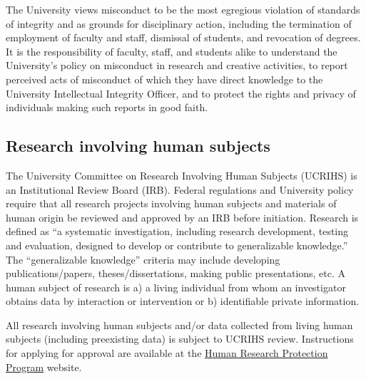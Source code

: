 The University views misconduct to be the most egregious violation of
standards of integrity and as grounds for disciplinary action,
including the termination of employment of faculty and staff,
dismissal of students, and revocation of degrees. It is the
responsibility of faculty, staff, and students alike to understand the
University’s policy on misconduct in research and creative activities,
to report perceived acts of misconduct of which they have direct
knowledge to the University Intellectual Integrity Officer, and to
protect the rights and privacy of individuals making such reports in
good faith. 

\subsection{Research involving human subjects}

The University Committee on Research Involving Human Subjects (UCRIHS)
is an Institutional Review Board (IRB). Federal regulations and
University policy require that all research projects involving human
subjects and materials of human origin be reviewed and approved by an
IRB before initiation. Research is defined as ``a systematic
investigation, including research development, testing and evaluation,
designed to develop or contribute to generalizable knowledge.'' The
``generalizable knowledge'' criteria may include developing
publications/papers, theses/dissertations, making public
presentations, etc. A human subject of research is a) a living
individual from whom an investigator obtains data by interaction or
intervention or b) identifiable private information.  

All research involving human subjects and/or data collected from
living human subjects (including preexisting data) is subject to
UCRIHS review. Instructions for applying for approval are available at
the \href{http://hrpp.msu.edu/}{Human Research Protection Program}
website.

